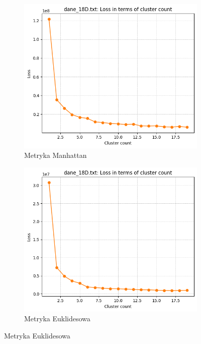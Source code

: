 \documentclass[polish,12pt,a4paper]{extarticle}
\begin{document}
\begin{figure}[h!]
    \centering
    \begin{subfigure}[b]{0.30\textwidth}
        \includegraphics[width=\linewidth]{img/elbow/data18d_manhattan.png}
        \captionsetup{labelformat=empty}
        \caption{Metryka Manhattan}
    \end{subfigure}
    \hspace{}
    \begin{subfigure}[b]{0.30\textwidth}
        \includegraphics[width=\linewidth]{img/elbow/data18d.png}
        \captionsetup{labelformat=empty}
        \caption{Metryka Euklidesowa}
    \end{subfigure}

    \label{fig:data_grid}
\end{figure} \FloatBarrier
\end{document}
